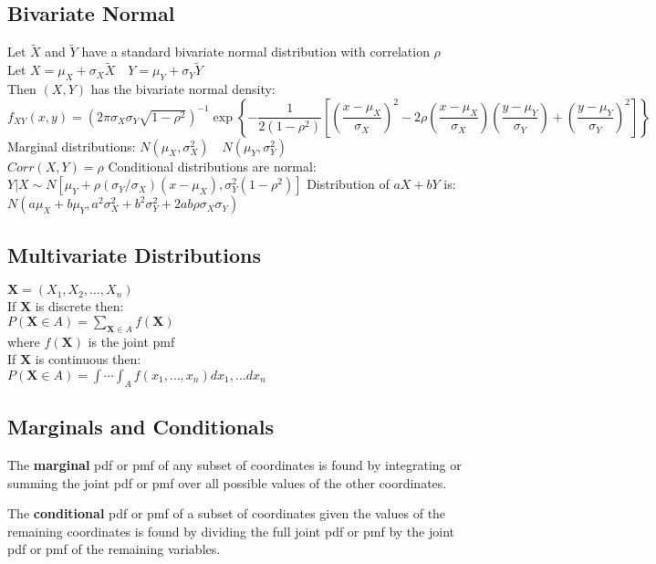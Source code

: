 \documentclass{article}
\begin{document}
\begin{flushleft}
\subsection*{Bivariate Normal}
Let $\tilde{X}$ and $\tilde{Y}$ have a standard bivariate normal distribution with correlation $\rho$\\
Let $X=\mu_X+\sigma_X\tilde{X} \quad Y=\mu_Y+\sigma_Y\tilde{Y}$\\
Then $(X,Y)$ has the bivariate normal density:\\
$f_{XY}(x,y)=\left(2\pi \sigma_X \sigma_Y \sqrt{1-\rho^2} \right)^{-1}\exp{\left\{-\dfrac{1}{2(1-\rho^2)}\left[\left(\dfrac{x-\mu_X}{\sigma_X} \right)^2- 2\rho \left(\dfrac{x-\mu_X}{\sigma_X} \right)\left(\dfrac{y-\mu_Y}{\sigma_Y} \right)+\left(\dfrac{y-\mu_Y}{\sigma_Y} \right)^2 \right] \right\}}$\medbreak
Marginal distributions: $N(\mu_X,\sigma^2_X) \quad N(\mu_Y,\sigma^2_Y)$\\
$Corr(X,Y)=\rho$\medbreak
Conditional distributions are normal:\\
$Y|X \sim N[\mu_Y+\rho(\sigma_Y/\sigma_X)(x-\mu_X),\sigma^2_Y(1-\rho^2)]$\medbreak
Distribution of $aX+bY$ is:\\
$N(a\mu_X+b\mu_Y,a^2\sigma^2_X+b^2\sigma^2_Y+2ab\rho \sigma_X \sigma_Y)$
\subsection*{Multivariate Distributions}
$\boldsymbol{X}=(X_1,X_2,\dots, X_n)$\\
If $\boldsymbol{X}$ is discrete then:\\
$P(\boldsymbol{X} \in A)=\sum_{\boldsymbol{X} \in A} f(\boldsymbol{X})$\\
where $f(\boldsymbol{X})$ is the joint pmf\\
If $\boldsymbol{X}$ is continuous then:\\
$P(\boldsymbol{X}\in A)=\int \cdots \int_{A}f(x_1,\dots,x_n)dx_1,\dots dx_n$\medbreak
\subsection*{Marginals and Conditionals}
The \textbf{marginal} pdf or pmf of any subset of coordinates is found by integrating or summing the joint pdf or pmf over all possible values of the other coordinates.\medbreak

The \textbf{conditional} pdf or pmf of a subset of coordinates given the values of the remaining coordinates is found by dividing the full joint pdf or pmf by the joint pdf or pmf of the remaining variables.


\end{flushleft}
\end{document}
